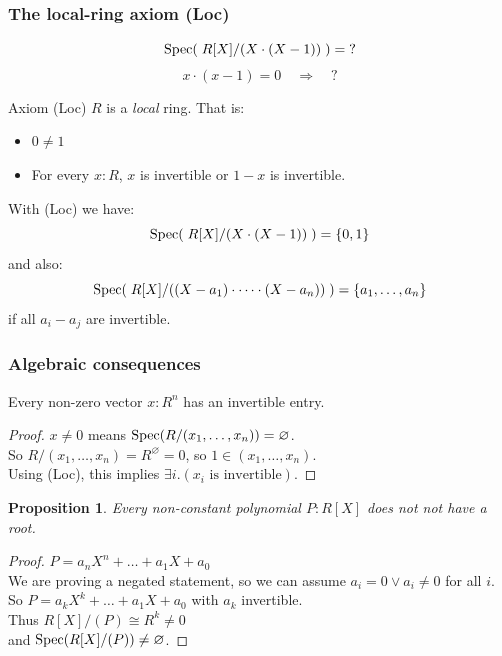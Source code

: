 \documentclass[aspectratio=1610]{beamer}
\newtheorem{proposition}{Proposition}
\begin{document}
\begin{frame}
  \frametitle{The local-ring axiom (Loc)}

  \[ \operatorname{Spec}(\;R[X]/(X\cdot(X-1))\;) = \text{?} \]
  \[ x \cdot (x-1) = 0 \quad \Rightarrow \quad \text{?} \]

  \pause%
  \bigskip
  \begin{block}{Axiom (Loc)}
    $R$ is a \emph{local} ring.
    That is:
    \begin{itemize}
      \item
        $0 \neq 1$
      \item
        For every $x : R$,
        $x$ is invertible or $1 - x$ is invertible.
    \end{itemize}
  \end{block}

  \bigskip
  With (Loc) we have:
  \[ \operatorname{Spec}(\;R[X]/(X\cdot(X-1))\;) = \{0, 1\} \]
  \pause%
  and also:
  \[ \operatorname{Spec}(\;R[X]/((X-a_1)\cdot \dots \cdot(X-a_n))\;) = \{a_1, \dots, a_n\} \]
  if all $a_i - a_j$ are invertible.
\end{frame}

\begin{frame}
  \frametitle{Algebraic consequences}

  \begin{corollary}
    Every non-zero vector $x : R^n$ has an invertible entry.\\
  \end{corollary}
  \begin{proof}
    \pause%
    $x \neq 0$ means $\operatorname{Spec}(R/(x_1, \dots, x_n)) = \varnothing$.\\
    \pause%
    So $R/(x_1, \dots, x_n) = R^\varnothing = 0$, so $1 \in (x_1, \dots, x_n)$.\\
    \pause%
    Using (Loc), this implies $\exists i. (\text{$x_i$ is invertible})$.
  \end{proof}

  \pause%
  \begin{proposition}
    Every non-constant polynomial $P : R[X]$ does not not have a root.
  \end{proposition}
  \begin{proof}
    \pause%
    $P = a_nX^n + \dots + a_1X + a_0$\\
    \pause%
    We are proving a negated statement, so we can assume $a_i = 0 \lor a_i \neq 0$ for all $i$.\\
    \pause%
    So $P = a_kX^k + \dots + a_1X + a_0$ with $a_k$ invertible.\\
    \pause%
    Thus $R[X]/(P) \cong R^k \neq 0$\\
    \pause%
    and $\operatorname{Spec}(R[X]/(P)) \neq \varnothing$.
  \end{proof}
\end{frame}
\end{document}
